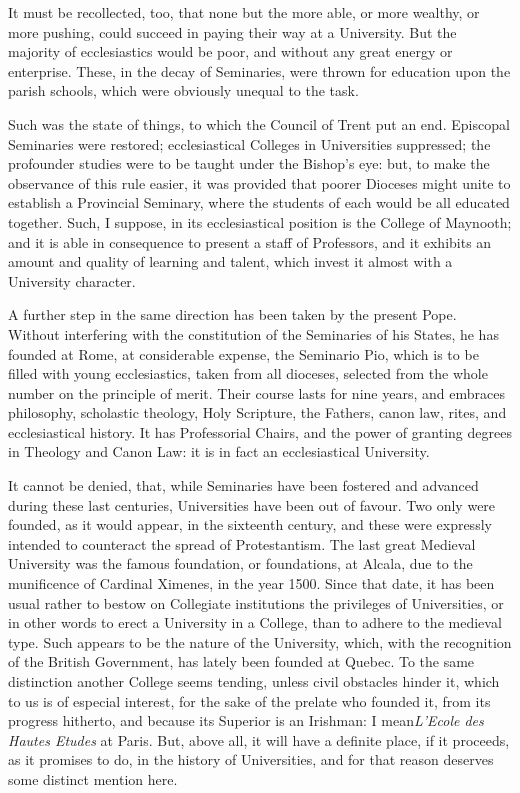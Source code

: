 It must be recollected, too,
that none but the more able, or more wealthy, or more pushing, could
succeed in paying their way at a University. But the majority of
ecclesiastics would be poor, and without any great energy or
enterprise. These, in the decay of Seminaries, were thrown for
education upon the parish schools, which were obviously unequal to the
task.

Such was the state of things,
to which the Council of Trent put an end. Episcopal Seminaries were
restored; ecclesiastical Colleges in Universities suppressed; the
profounder studies were to be taught under the Bishop's eye: but, to
make the observance of this rule easier, it was provided that poorer
Dioceses might unite to establish a Provincial Seminary, where the
students of each would be all educated together. Such, I suppose, in
its ecclesiastical position is the College of Maynooth; and it is able
in consequence to present a staff of Professors, and it exhibits an
amount and quality of learning and talent, which invest it almost with
a University character.

A further step in the same
direction has been taken by the present Pope. Without interfering with
the constitution of the Seminaries of his States, he has founded at
Rome, at considerable expense, the Seminario Pio, which is to be
filled with young ecclesiastics, taken from all dioceses, selected
from the whole number on the principle of merit. Their course lasts
for nine years, and embraces philosophy, scholastic theology, Holy
Scripture, the Fathers, canon law, rites, and ecclesiastical history.
It has Professorial Chairs, and the power of granting degrees in
Theology and Canon Law: it is in fact an ecclesiastical University.

It cannot be denied, that,
while Seminaries have been fostered and advanced during these
last centuries, Universities have been out of favour. Two only were
founded, as it would appear, in the sixteenth century, and these were
expressly intended to counteract the spread of Protestantism. The last
great Medieval University was the famous foundation, or foundations,
at Alcala, due to the munificence of Cardinal Ximenes, in the year
1500. Since that date, it has been usual rather to bestow on
Collegiate institutions the privileges of Universities, or in other
words to erect a University in a College, than to adhere to the
medieval type. Such appears to be the nature of the University, which,
with the recognition of the British Government, has lately been
founded at Quebec. To the same distinction another College seems
tending, unless civil obstacles hinder it, which to us is of especial
interest, for the sake of the prelate who founded it, from its
progress hitherto, and because its Superior is an Irishman: I mean\emph{L'Ecole des Hautes Etudes} at Paris. But, above all, it will have a
definite place, if it proceeds, as it promises to do, in the history
of Universities, and for that reason deserves some distinct mention
here.

